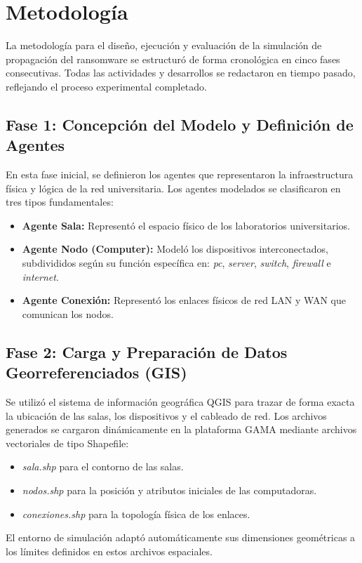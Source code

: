 \section{Metodología}

La metodología para el diseño, ejecución y evaluación de la simulación de propagación del ransomware se estructuró de forma cronológica en cinco fases consecutivas. Todas las actividades y desarrollos se redactaron en tiempo pasado, reflejando el proceso experimental completado.

\subsection{Fase 1: Concepción del Modelo y Definición de Agentes}
En esta fase inicial, se definieron los agentes que representaron la infraestructura física y lógica de la red universitaria. Los agentes modelados se clasificaron en tres tipos fundamentales:
\begin{itemize}
    \item \textbf{Agente Sala:} Representó el espacio físico de los laboratorios universitarios.
    \item \textbf{Agente Nodo (Computer):} Modeló los dispositivos interconectados, subdivididos según su función específica en: \textit{pc}, \textit{server}, \textit{switch}, \textit{firewall} e \textit{internet}.
    \item \textbf{Agente Conexión:} Representó los enlaces físicos de red LAN y WAN que comunican los nodos.
\end{itemize}

\subsection{Fase 2: Carga y Preparación de Datos Georreferenciados (GIS)}
Se utilizó el sistema de información geográfica QGIS para trazar de forma exacta la ubicación de las salas, los dispositivos y el cableado de red. Los archivos generados se cargaron dinámicamente en la plataforma GAMA mediante archivos vectoriales de tipo Shapefile:
\begin{itemize}
    \item \textit{sala.shp} para el contorno de las salas.
    \item \textit{nodos.shp} para la posición y atributos iniciales de las computadoras.
    \item \textit{conexiones.shp} para la topología física de los enlaces.
\end{itemize}
El entorno de simulación adaptó automáticamente sus dimensiones geométricas a los límites definidos en estos archivos espaciales.

